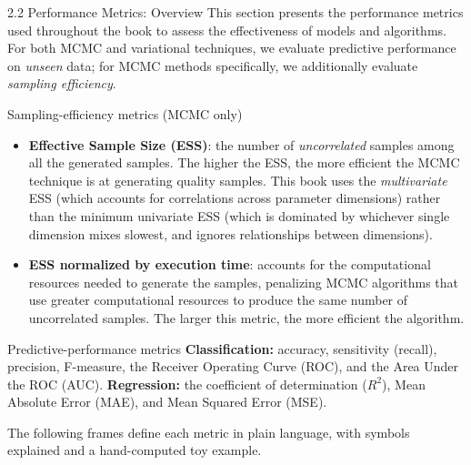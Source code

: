 \documentclass[aspectratio=169,10pt]{beamer}
\begin{document}
\begin{frame}[allowframebreaks]{2.2 Performance Metrics: Overview}
  This section presents the performance metrics used throughout the book to
  assess the effectiveness of models and algorithms. For both MCMC and
  variational techniques, we evaluate predictive performance on
  \emph{unseen} data; for MCMC methods specifically, we additionally
  evaluate \emph{sampling efficiency}.

  \begin{block}{Sampling-efficiency metrics (MCMC only)}
    \begin{itemize}
      \item \textbf{Effective Sample Size (ESS)}: the number of
        \emph{uncorrelated} samples among all the generated samples. The
        higher the ESS, the more efficient the MCMC technique is at
        generating quality samples. This book uses the
        \emph{multivariate} ESS (which accounts for correlations across
        parameter dimensions) rather than the minimum univariate ESS
        (which is dominated by whichever single dimension mixes slowest,
        and ignores relationships between dimensions).
      \item \textbf{ESS normalized by execution time}: accounts for the
        computational resources needed to generate the samples, penalizing
        MCMC algorithms that use greater computational resources to produce
        the same number of uncorrelated samples. The larger this metric,
        the more efficient the algorithm.
    \end{itemize}
  \end{block}

  \framebreak

  \begin{block}{Predictive-performance metrics}
    \textbf{Classification:} accuracy, sensitivity (recall), precision,
    F-measure, the Receiver Operating Curve (ROC), and the Area Under the
    ROC (AUC).
    \textbf{Regression:} the coefficient of determination ($R^2$), Mean
    Absolute Error (MAE), and Mean Squared Error (MSE).
  \end{block}

  The following frames define each metric in plain language, with symbols
  explained and a hand-computed toy example.
\end{frame}
\end{document}

